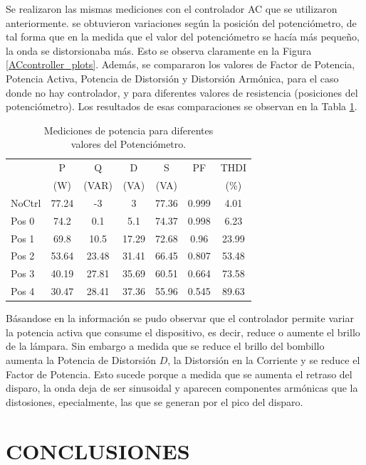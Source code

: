 \documentclass[journal]{IEEEtran}
\begin{document}
Se realizaron las mismas mediciones con el controlador AC 
que se utilizaron anteriormente. se obtuvieron variaciones 
según la posición del potenciómetro, de tal forma que en 
la medida que el valor del potenciómetro se hacía más
pequeño, la onda se distorsionaba más. Esto se observa 
claramente en la Figura \ref{ACcontroller_plots}. 
Además, se compararon los valores de
Factor de Potencia, Potencia Activa, Potencia de Distorsión
y Distorsión Armónica, para el caso donde no hay controlador, 
y para diferentes valores de resistencia (posiciones del 
potenciómetro). Los resultados 
de esas comparaciones se observan en la Tabla 
\ref{table:controller}. 


\begin{table}[h]
\begin{tabular}{|p{1.2cm}|c|c|c|c|c|c|}
\hline 
 & P  & Q  & D  & S  & PF & THDI  \\
 &(W) & (VAR) &(VA) & (VA) &  & (\%) \\ \hline  
NoCtrl & 77.24 & -3 & 3 & 77.36 & 0.999 & 4.01 \\ 
\hline 
Pos 0 & 74.2 & 0.1 & 5.1 & 74.37 & 0.998 & 6.23 \\ 
\hline 
Pos 1 & 69.8 & 10.5 & 17.29 & 72.68 & 0.96 & 23.99 \\
\hline 
Pos 2 & 53.64 & 23.48 & 31.41 & 66.45 & 0.807 & 53.48 \\
\hline 
Pos 3 & 40.19 & 27.81 & 35.69 & 60.51 & 0.664 & 73.58 \\ 
\hline
Pos 4 & 30.47 & 28.41 & 37.36 & 55.96 & 0.545 & 89.63 \\ 
\hline 
\end{tabular}
\caption{Mediciones de potencia para diferentes \\ valores 
del Potenciómetro.}
\label{table:controller}
\end{table}

Básandose en la información se pudo observar que el 
controlador permite variar la potencia activa que 
consume el dispositivo, es decir, reduce o aumente 
el brillo de la lámpara. Sin embargo a medida que se 
reduce el brillo del bombillo aumenta la Potencia de 
Distorsión $D$, la Distorsión en la Corriente y se 
reduce el Factor de Potencia. Esto sucede porque a
medida que se aumenta el retraso del disparo, la onda 
deja de ser sinusoidal y aparecen componentes armónicas 
que la distosiones, epecialmente, las que se 
generan por el pico del disparo. 

\section{CONCLUSIONES}
\end{document}
